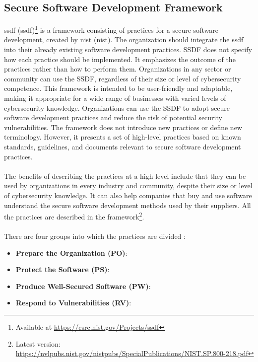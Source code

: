 \subsection{Secure Software Development Framework}
\label{ssdf}
\acrlong{ssdf} (\acrshort{ssdf})\footnote{Available at \url{https://csrc.nist.gov/Projects/ssdf}} is a framework consisting of practices for a secure software development, created by \acrlong{nist} (\acrshort{nist}). The organization should integrate the \acrshort{ssdf} into their already existing software development practices. SSDF does not specify how each practice should be implemented. It emphasizes the outcome of the practices rather than how to perform them. Organizations in any sector or community can use the SSDF, regardless of their size or level of cybersecurity competence. This framework is intended to be user-friendly and adaptable, making it appropriate for a wide range of businesses with varied levels of cybersecurity knowledge. Organizations can use the SSDF to adopt secure software development practices and reduce the risk of potential security vulnerabilities. The framework does not introduce new practices or define new terminology. However, it presents a set of high-level practices based on known standards, guidelines, and documents relevant to secure software development practices. 
\\~\\
The benefits of describing the practices at a high level include that they can be used by organizations in every industry and community, despite their size or level of cybersecurity knowledge. It can also help companies that buy and use software understand the secure software development methods used by their suppliers. All the practices are described in the framework\footnote{Latest version: \url{https://nvlpubs.nist.gov/nistpubs/SpecialPublications/NIST.SP.800-218.pdf}}.
\\~\\
There are four groups into which the practices are divided \cite{ssdf}:
\begin{itemize}
  \item \textbf{Prepare the Organization (PO)}: \textit{}
  \item \textbf{Protect the Software (PS)}: \textit{}
  \item \textbf{Produce Well-Secured Software (PW)}: 
  \item \textbf{Respond to Vulnerabilities (RV)}: \textit{}
\end{itemize}

